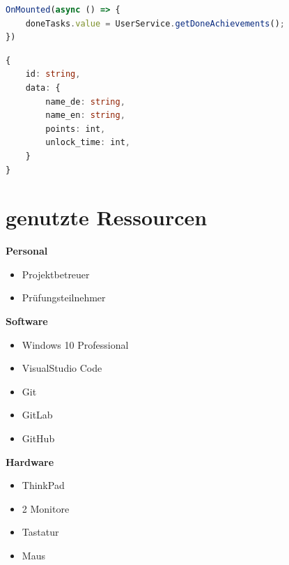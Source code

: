 \documentclass[11pt]{article}
\begin{document}
\begin{lstlisting}[language=TypeScript, caption=OnMounted-Lifecyclehook Beispiel]
OnMounted(async () => {
    doneTasks.value = UserService.getDoneAchievements();
})
\end{lstlisting}

\begin{lstlisting}[language=Typescript, caption=Achievement Datenmodell]
{
    id: string,
    data: {
        name_de: string,
        name_en: string,
        points: int,
        unlock_time: int,
    }
}    
\end{lstlisting}

\clearpage


\appendix

\section{genutzte Ressourcen}
\textbf{Personal}
\begin{itemize}
    \item Projektbetreuer
    \item Prüfungsteilnehmer
\end{itemize}
\textbf{Software}
\begin{itemize}
    \item Windows 10 Professional
    \item VisualStudio Code
    \item Git
    \item GitLab
    \item GitHub
\end{itemize}
\textbf{Hardware}
\begin{itemize}
    \item ThinkPad
    \item 2 Monitore
    \item Tastatur
    \item Maus
\end{itemize}



\end{document}
